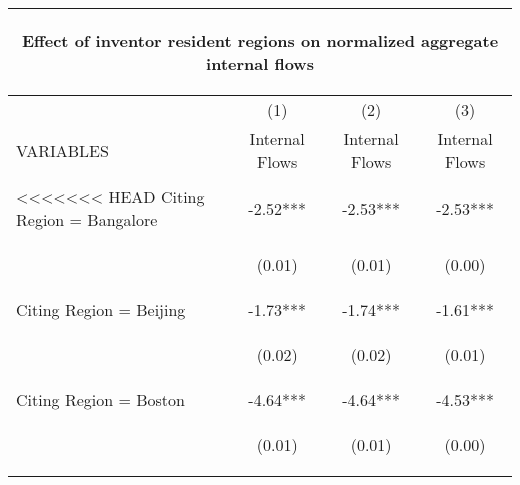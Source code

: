 \begin{center}
\begin{tabular}{lccc}
\multicolumn{4}{c}{\begin{large}Effect of inventor resident regions on normalized aggregate internal flows \label{internal}\end{large}} \\ \hline
 & (1) & (2) & (3) \\
VARIABLES & Internal Flows & Internal Flows & Internal Flows \\ \hline
\vspace{4pt} & \begin{footnotesize}\end{footnotesize} & \begin{footnotesize}\end{footnotesize} & \begin{footnotesize}\end{footnotesize} \\
<<<<<<< HEAD
Citing Region = Bangalore & -2.52*** & -2.53*** & -2.53*** \\
\vspace{4pt} & \begin{footnotesize}(0.01)\end{footnotesize} & \begin{footnotesize}(0.01)\end{footnotesize} & \begin{footnotesize}(0.00)\end{footnotesize} \\
Citing Region = Beijing & -1.73*** & -1.74*** & -1.61*** \\
\vspace{4pt} & \begin{footnotesize}(0.02)\end{footnotesize} & \begin{footnotesize}(0.02)\end{footnotesize} & \begin{footnotesize}(0.01)\end{footnotesize} \\
Citing Region = Boston & -4.64*** & -4.64*** & -4.53*** \\
\vspace{4pt} & \begin{footnotesize}(0.01)\end{footnotesize} & \begin{footnotesize}(0.01)\end{footnotesize} & \begin{footnotesize}(0.00)\end{footnotesize} \\

\end{tabular}
\end{center}
